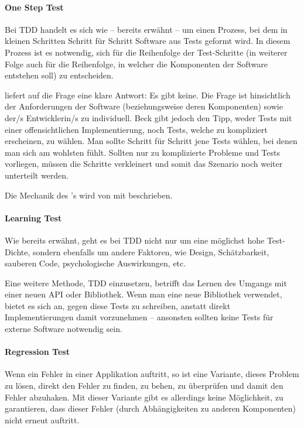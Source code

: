{\paragraph{One Step Test}
Bei TDD handelt es sich wie -- bereits erwähnt -- um einen Prozess, bei dem in kleinen Schritten Schritt für Schritt Software aus Tests geformt wird. In diesem Prozess ist es notwendig, sich für die Reihenfolge der Test-Schritte (in weiterer Folge auch für die Reihenfolge, in welcher die Komponenten der Software entstehen soll) zu entscheiden.

\cite[134]{Beck:2003} liefert auf die Frage  eine klare Antwort: Es gibt keine.
Die Frage ist hinsichtlich der Anforderungen der Software (beziehungsweise deren Komponenten) sowie der/s Entwicklerin/s zu individuell.
Beck gibt jedoch den Tipp, weder Tests mit einer offensichtlichen Implementierung, noch Tests, welche zu kompliziert erscheinen, zu wählen. Man sollte Schritt für Schritt jene Tests wählen, bei denen man sich am wohlsten fühlt. Sollten nur zu komplizierte Probleme und Tests vorliegen, müssen die Schritte verkleinert und somit das Szenario noch weiter unterteilt werden.

Die Mechanik des 's wird von \cite[134]{Beck:2003} mit  beschrieben.

\paragraph{Learning Test}

Wie bereits erwähnt, geht es bei TDD nicht nur um eine möglichst hohe Test-Dichte, sondern ebenfalls um andere Faktoren, wie Design, Schätzbarkeit, sauberen Code, psychologische Auswirkungen, etc.

Eine weitere Methode, TDD einzusetzen, betrifft das Lernen des Umgangs mit einer neuen API oder Bibliothek. Wenn man eine neue Bibliothek verwendet, bietet es sich an, gegen diese Tests zu schreiben, anstatt direkt Implementierungen damit vorzunehmen -- ansonsten sollten keine Tests für externe Software notwendig sein.

\paragraph{Regression Test}
Wenn ein Fehler in einer Applikation auftritt, so ist eine Variante, dieses Problem zu lösen, direkt den Fehler zu finden, zu behen, zu überprüfen und damit den Fehler abzuhaken. Mit dieser Variante gibt es allerdings keine Möglichkeit, zu garantieren, dass dieser Fehler (durch Abhängigkeiten zu anderen Komponenten) nicht erneut auftritt.

}
